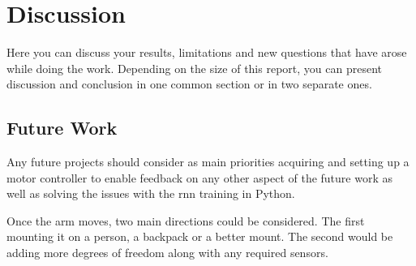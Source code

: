 \section{Discussion}
\label{section:disc}
Here you can discuss your results, limitations and new questions that have arose while doing the work. Depending on the size of this report, you can present discussion and conclusion in one common section or in two separate ones. 



\subsection{Future Work}

Any future projects should consider as main priorities acquiring and setting up a motor controller to enable feedback on any other aspect of the future work
as well as solving the issues with the \acrshort{rnn} training in Python.

Once the arm moves, two main directions could be considered. The first mounting it on a person, a backpack or a better mount. The second would be adding more degrees of freedom along with any required sensors.

%
%
